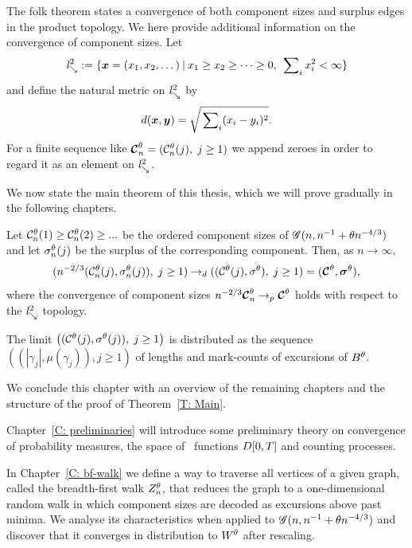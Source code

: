 The folk theorem states a convergence of both component sizes and surplus edges in the product topology.
We here provide additional information on the convergence of component sizes.
Let
\begin{equation}
	\mathit{l}^2_{\searrow} := \{ \boldsymbol{x} = (x_1, x_2, \dots) \: | \: x_1 \geq x_2 \geq \dots \geq 0, \; \sideset{}{_i}\sum x^2_i < \infty \}
\end{equation}
and define the natural metric on $\mathit{l}^2_{\searrow}$ by
\begin{equation}
	d(\boldsymbol{x},\boldsymbol{y}) = \sqrt{\sideset{}{_i}\sum (x_i - y_i)^2}.
\end{equation}
For a finite sequence like $\boldsymbol{\mathcal{C}}^{\theta}_n = (\mathcal{C}^{\theta}_n(j), \; j \geq 1)$ we append zeroes in order to regard it as an element on $\mathit{l}^2_{\searrow}$.


We now state the main theorem of this thesis, which we will prove gradually in the following chapters.
\begin{theorem} \label{T: Main}
	Let $\mathcal{C}^{\theta}_n(1) \geq \mathcal{C}^{\theta}_n(2) \geq ... $ be the ordered component sizes of $\mathscr{G}(n, n^{-1} + \theta n^{-4/3})$
	and let $\mathcal{\sigma}^{\theta}_n(j)$ be the surplus of the corresponding component.
	Then, as $n \rightarrow \infty$,
	\begin{equation}
	( n^{-2 / 3} ( \mathcal{C}^{\theta}_n(j), \mathcal{\sigma}^{\theta}_n(j) ), \; j \geq 1 ) 
	\rightarrow_d
	( (\mathcal{C}^{\theta}(j), \mathcal{\sigma}^{\theta}), \; j \geq 1 )
	= ( \boldsymbol{\mathcal{C}}^{\theta}, \boldsymbol{\mathcal{\sigma}}^{\theta} ),
	\end{equation}
	where the convergence of component sizes
	$n^{-2 / 3} \boldsymbol{\mathcal{C}}^{\theta}_n \rightarrow_p \boldsymbol{\mathcal{C}}^{\theta}$
	holds with respect to the $\mathit{l}^2_{\searrow}$ topology.
	
	The limit
	$\left( ( \mathcal{C}^{\theta}(j), \mathcal{\sigma}^{\theta}(j) ), \; j \geq 1 \right)$
	is distributed as the sequence
	$ \left( (|\gamma_j|, \mu(\gamma_j)), j \geq 1  \right) $
	of lengths and mark-counts of excursions of $B^{\theta}$.
\end{theorem}

\bigskip

We conclude this chapter with an overview of the remaining chapters and the structure of the proof of Theorem~\ref{T: Main}.

Chapter~\ref{C: preliminaries} will introduce some preliminary theory on convergence of probability measures,
the space of \cadlag~functions $D[0, T]$ and counting processes.

In Chapter~\ref{C: bf-walk} we define a way to traverse all vertices of a given graph, called the breadth-first walk $Z_n^{\theta}$, 
that reduces the graph to a one-dimensional random walk in which component sizes are decoded as excursions above past minima.
We analyse its characteristics when applied to $\mathscr{G}(n, n^{-1} + \theta n^{-4/3})$ and discover that it converges in distribution to $W^{\theta}$ after rescaling.

